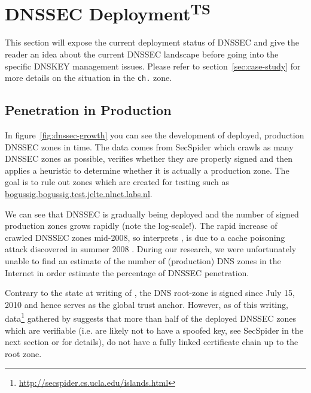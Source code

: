 \documentclass[a4paper,twocolumn]{scrartcl}
\newcommand{\wbts}{\textsuperscript{TS}}
\begin{document}
\section{DNSSEC Deployment\wbts}

This section will expose the current deployment status of DNSSEC and
give the reader an idea about the current DNSSEC landscape before
going into the specific DNSKEY management issues. Please refer to
section~\ref{sec:case-study} for more details on the situation in the
\verb|ch.| zone.

\subsection{Penetration in Production}
In figure~\ref{fig:dnssec-growth} you can see the development of
deployed, production DNSSEC zones in time. The data comes from
SecSpider \cite{secspider} which crawls as many DNSSEC zones as
possible, verifies whether they are properly signed and then applies a
heuristic to determine whether it is actually a production zone. The
goal is to rule out zones which are created for testing such as
\url{bogussig.bogussig.test.jelte.nlnet.labs.nl}.

We can see that DNSSEC is gradually being deployed and the number of
signed production zones grows rapidly (note the log-scale!). The rapid
increase of crawled DNSSEC zones mid-2008, so interprets
\cite{Osterweil09}, is due to a cache poisoning attack discovered in
summer 2008 \cite{dnsVuln}. During our research, we were unfortunately
unable to find an estimate of the number of (production) DNS zones in
the Internet in order estimate the percentage of DNSSEC penetration.

Contrary to the state at writing of \cite{Osterweil09}, the DNS
root-zone is signed since July 15, 2010 \cite{root-dnssec} and hence
serves as the global trust anchor. However, as of this writing,
data\footnote{\url{http://secspider.cs.ucla.edu/islands.html}}
gathered by \cite{secspider} suggests that more than half of the
deployed DNSSEC zones which are verifiable (i.e. are likely not to
have a spoofed key, see SecSpider in the next section or
\cite{Osterweil09} for details), do not have a fully linked
certificate chain up to the root zone.
\end{document}

